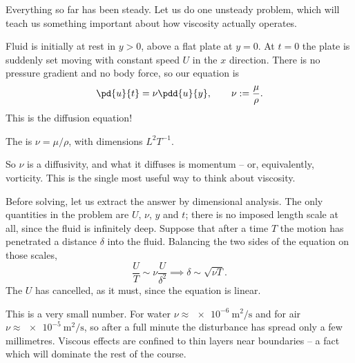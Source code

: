 Everything so far has been steady. Let us do one unsteady problem, which will teach us something important about how viscosity actually operates.

\begin{example}
	Fluid is initially at rest in $y > 0$, above a flat plate at $y = 0$. At $t = 0$ the plate is suddenly set moving with constant speed $U$ in the $x$ direction. There is no pressure gradient and no body force, so our equation is
	$$
	\pd{u}{t} = \nu \pdd{u}{y}, \qquad \nu := \frac{\mu}{\rho}.
	$$
	This is the diffusion equation!

	\begin{definition}
		The  is $\nu = \mu / \rho$, with dimensions $L^2 T^{-1}$.
	\end{definition}

	So $\nu$ is a diffusivity, and what it diffuses is momentum -- or, equivalently, vorticity. This is the single most useful way to think about viscosity.

	Before solving, let us extract the answer by dimensional analysis. The only quantities in the problem are $U$, $\nu$, $y$ and $t$; there is no imposed length scale at all, since the fluid is infinitely deep. Suppose that after a time $T$ the motion has penetrated a distance $\delta$ into the fluid. Balancing the two sides of the equation on those scales,
	$$
	\frac{U}{T} \sim \nu \frac{U}{\delta^2} \implies \delta \sim \sqrt{\nu T}.
	$$
	The $U$ has cancelled, as it must, since the equation is linear.

	This is a very small number. For water $\nu \approx \SI{e-6}{\meter\squared\per\second}$ and for air $\nu \approx \SI{e-5}{\meter\squared\per\second}$, so after a full minute the disturbance has spread only a few millimetres. Viscous effects are confined to thin layers near boundaries -- a fact which will dominate the rest of the course.


\end{example}
